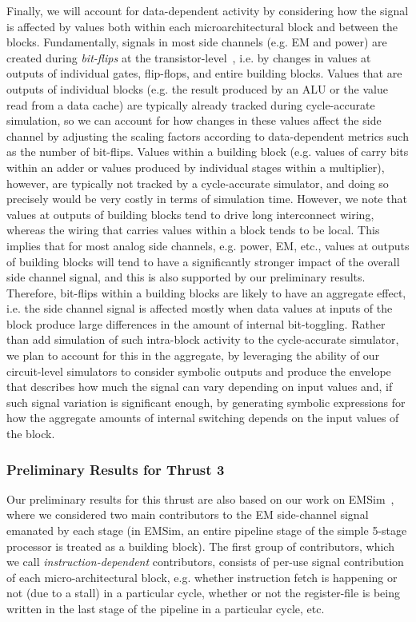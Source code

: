 Finally, we will account for data-dependent activity by considering how the signal is affected by values both within each microarchitectural block and between the blocks. Fundamentally, signals in most side channels (e.g. EM and power) are created during  \textit{bit-flips} at the transistor-level~\cite{VANECK1985269,6766222}, i.e. by changes in values at outputs of individual gates, flip-flops, and entire building blocks. Values that are outputs of individual blocks (e.g. the result produced by an ALU or the value read from a data cache) are typically already tracked during cycle-accurate simulation, so we can account for how changes in these values affect the side channel by adjusting the scaling factors according to data-dependent metrics such as the number of bit-flips. Values within a building block (e.g. values of carry bits within an adder or values produced by individual stages within a multiplier), however, are typically not tracked by a cycle-accurate simulator, and doing so precisely would be very costly in terms of simulation time. However, we note that values at outputs of building blocks tend to drive long interconnect wiring, whereas the wiring that carries values within a block tends to be local. This implies that for most analog side channels, e.g. power, EM, etc., values at outputs of building blocks will tend to have a significantly stronger impact of the overall side channel signal, and this is also supported by our preliminary results. Therefore, bit-flips within a building blocks are likely to have an aggregate effect, i.e. the side channel signal is affected mostly when data values at inputs of the block produce large differences in the amount of internal bit-toggling. Rather than add simulation of such intra-block activity to the cycle-accurate simulator, we plan to account for this in the aggregate, by leveraging the ability of our circuit-level simulators to consider symbolic outputs and produce the envelope that describes how much the signal can vary depending on input values and, if such signal variation is significant enough, by generating symbolic expressions for how the aggregate amounts of internal switching depends on the input values of the block.

\subsubsection{Preliminary Results for Thrust 3}
\label{sec:prelim-transform}

Our preliminary results for this thrust are also based on our work on EMSim~\cite{Nader2020}, where we considered two main contributors to the EM side-channel signal emanated by each stage (in EMSim, an entire pipeline stage of the simple 5-stage processor is treated as a building block). The first group of contributors, which we call \textit{instruction-dependent} contributors, consists of per-use signal contribution of each micro-architectural block, e.g. whether instruction fetch is happening or not (due to a stall) in a particular cycle, whether or not the register-file is being written in the last stage of the pipeline in a particular cycle, etc.

